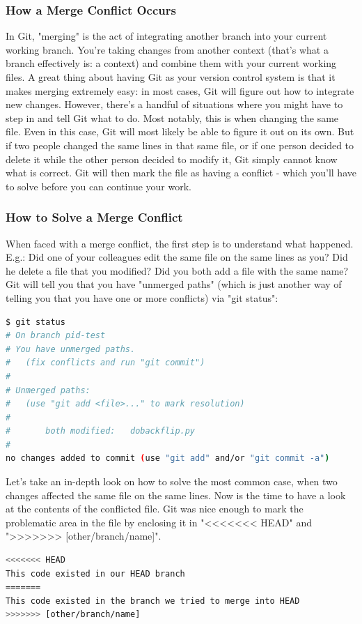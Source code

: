 \documentclass{article}
\begin{document}
\subsubsection{How a Merge Conflict Occurs}
In Git, "merging" is the act of integrating another branch into your current working branch. You're taking changes from another context (that's what a branch effectively is: a context) and combine them with your current working files.
\newline\newline
A great thing about having Git as your version control system is that it makes merging extremely easy: in most cases, Git will figure out how to integrate new changes.
\newline\newline
However, there's a handful of situations where you might have to step in and tell Git what to do. Most notably, this is when changing the same file. Even in this case, Git will most likely be able to figure it out on its own. But if two people changed the same lines in that same file, or if one person decided to delete it while the other person decided to modify it, Git simply cannot know what is correct. Git will then mark the file as having a conflict - which you'll have to solve before you can continue your work.
\subsubsection{How to Solve a Merge Conflict}
When faced with a merge conflict, the first step is to understand what happened. E.g.: Did one of your colleagues edit the same file on the same lines as you? Did he delete a file that you modified? Did you both add a file with the same name?
Git will tell you that you have "unmerged paths" (which is just another way of telling you that you have one or more conflicts) via "git status":
\begin{lstlisting}[language=bash]
$ git status
# On branch pid-test
# You have unmerged paths.
#   (fix conflicts and run "git commit")
#
# Unmerged paths:
#   (use "git add <file>..." to mark resolution)
#
#       both modified:   dobackflip.py
#
no changes added to commit (use "git add" and/or "git commit -a")
\end{lstlisting}

Let's take an in-depth look on how to solve the most common case, when two changes affected the same file on the same lines.
Now is the time to have a look at the contents of the conflicted file. Git was nice enough to mark the problematic area in the file by enclosing it in "<<<<<<< HEAD" and ">>>>>>> [other/branch/name]".
\begin{lstlisting}[language=bash]
<<<<<<< HEAD
This code existed in our HEAD branch
=======
This code existed in the branch we tried to merge into HEAD
>>>>>>> [other/branch/name]
\end{lstlisting}
\end{document}
